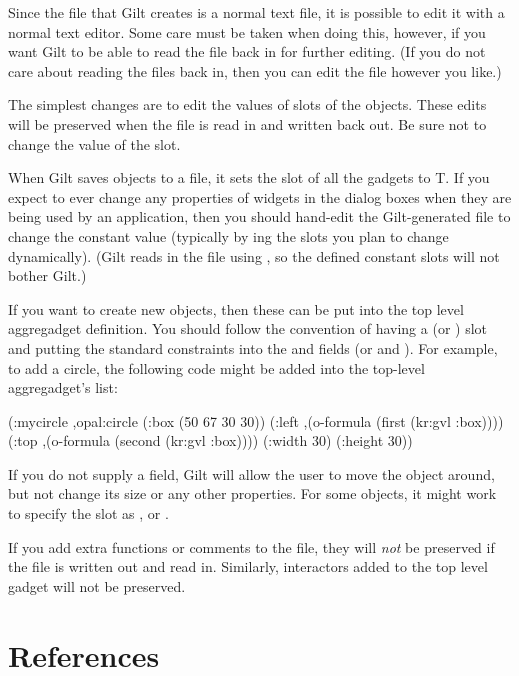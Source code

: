 Since the file that Gilt creates is a normal text file, it is possible
to edit it with a normal text editor.  Some care must be taken when
doing this, however, if you want Gilt to be able to read the file back
in for further editing.  (If you do not care about reading the files
back in, then you can edit the file however you like.)

The simplest changes are to edit the values of slots of the objects.
These edits will be preserved when the file is read in and written
back out.  Be sure not to change the value of the  slot.

When Gilt saves objects to a file, it sets the  slot of
all the gadgets to T.  If you expect to ever change any properties of
widgets in the dialog boxes when they are being used by an
application, then you should hand-edit the Gilt-generated file to
change the constant value (typically by ing the slots you
plan to change dynamically).  (Gilt reads in the file using
, so the defined constant slots will not
bother Gilt.)

If you want to create new objects, then these can be put into the top
level aggregadget definition.
You should follow the convention of having a  (or
) slot and
putting the standard constraints into the  and 
fields (or  and ).  For example, to add a
circle, the following code might be
added into the top-level aggregadget's  list:
\begin{programexample}
    (:mycircle ,opal:circle
      (:box (50 67 30 30))
      (:left ,(o-formula (first (kr:gvl :box))))
      (:top ,(o-formula (second (kr:gvl :box))))
      (:width 30)
      (:height 30))
\end{programexample}
If you do not supply a  field, Gilt will allow
the user to move the object around, but not
change its size or any other properties.  For some objects, it might
work to specify the  slot as ,
 or .

If you add extra functions or comments to the file, they will {\it not}
be preserved if the file is written out and read in.  Similarly,
interactors added to the top level gadget will not be preserved.

\chapter*{References}

